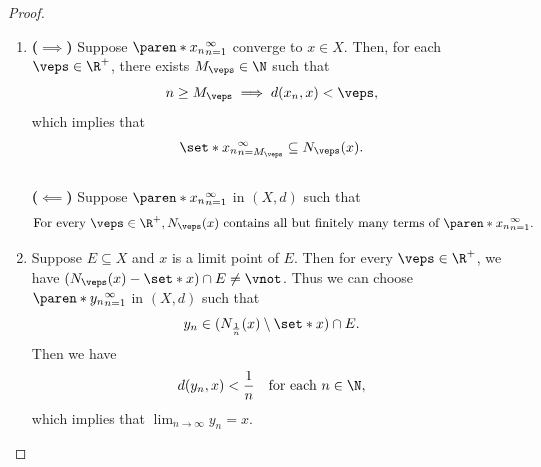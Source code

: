 \begin{proof}
  \leavevmode\par
  \begin{enumerate}[label=\textbf{(\Alph*)}]
    \item \textbf{($\implies$)} Suppose $\paren*{x_{n}}_{n = 1}^{\infty}$ converge to $x \in X$. Then, for each
          $\veps \in \R^{+}$, there exists $M_{\veps} \in \N$ such that
          \[
            n \geq M_{\veps} \implies d(x_{n}, x) < \veps,
          \]
          which implies that
          \[
            \set*{x_{n}}_{n = M_{\veps}}^{\infty} \subseteq N_{\veps}(x).
          \]
          \\[6mm]
          \textbf{($\impliedby$)} Suppose $\paren*{x_{n}}_{n = 1}^{\infty}$ in $(X, d)$ such that
          \[
            \text{For every } \veps \in \R^{+}, N_{\veps}(x) \text{ contains all but
              finitely many terms of } \paren*{x_{n}}_{n = 1}^{\infty}.
          \]
    \item Suppose $E \subseteq X$ and $x$ is a limit point of $E$. Then for every $\veps \in
            \R^{+}$, we have $(N_{\veps}(x) - \set*{x}) \cap E \neq \vnot$. Thus we can choose
          $\paren*{y_{n}}_{n = 1}^{\infty}$ in $(X, d)$ such that
          \[
            y_{n} \in (N_{\frac{1}{n}}(x) \setminus \set*{x}) \cap E.
          \]
          Then we have
          \[
            d(y_{n}, x) < \frac{1}{n} \quad \text{for each } n \in \N,
          \]
          which implies that $\lim_{n \to \infty} y_{n} = x$.
  \end{enumerate}
\end{proof}
